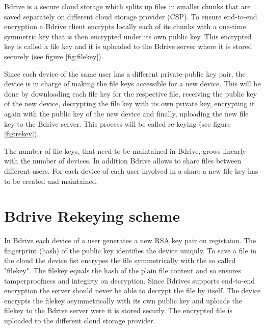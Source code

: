 Bdrive is a secure cloud storage which splits up files in smaller chunks that are saved separately on different cloud storage provider (CSP). To ensure end-to-end encryption a Bdrive client encrypts locally each of its chunks with a one-time symmetric key that is then encrypted under its own public key. This encrypted key is called a file key and it is uploaded to the Bdrive server where it is stored securely (see figure \ref{fig:filekey}).

Since each device of the same user has a different private-public key pair, the device is in charge of making the file keys accessible for a new device. This will be done by downloading each file key for the respective file, receiving the public key of the new device, decrypting the file key with its own private key, encrypting it again with the public key of the new device and finally, uploading the new file key to the Bdrive server. This process will be called re-keying (see figure \ref{fig:rekey}).

The number of file keys, that need to be maintained in Bdrive, grows linearly with the number of devices. In addition Bdrive allows to share files between different users. For each device of each user involved in a share a new file key has to be created and maintained. 




\section{Bdrive Rekeying scheme}

In Bdrive each device of a user generates a new RSA key pair on registaion. The fingerprint (hash) of the public key identifies the device uniquly. To save a file in the cloud the device fist encrypes the file symmetrically with the so called "filekey". The filekey equals the hash of the plain file content and so ensures tamperproofness and integirty on decryption. Since Bdrives supports end-to-end encryption the server should never be able to decrypt the file by itself. The device encrypts the filekey asymmetrically with its own public key and uploads the filekey to the Bdrive server were it is stored securly. The encrypted file is uploaded to the different cloud storage provider. 

